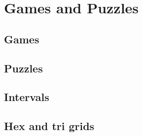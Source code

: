 
\chapter{Games and Puzzles}

\section{Games}
	
\section{Puzzles}

\section{Intervals}

\section{Hex and tri grids}
